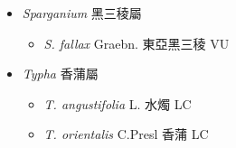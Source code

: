 
  \begin{itemize}
 \item[] \textit{Sparganium} 黑三稜屬
                                
  \begin{itemize}
        \item[] \textit{S. fallax} Graebn.  東亞黑三稜   VU
  \end{itemize}
 \item[] \textit{Typha} 香蒲屬
                                
  \begin{itemize}
        \item[] \textit{T. angustifolia} L.  水燭   LC
        \item[] \textit{T. orientalis} C.Presl  香蒲   LC
  \end{itemize}
  \end{itemize}
